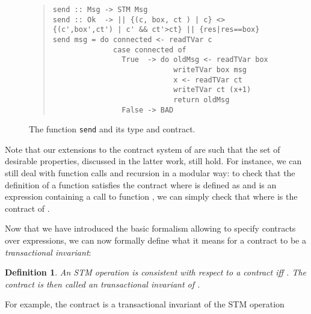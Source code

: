 \documentclass[submission,copyright,creativecommons]{eptcs}
\newtheorem{definition}{Definition}
\begin{document}
\begin{figure}[htb]
  \centering
\begin{footnotesize}
\begin{quote}
\begin{verbatim}
send :: Msg -> STM Msg
send :: Ok  -> || {(c, box, ct ) | c} <> {(c',box',ct') | c' && ct'>ct} || {res|res==box} 
send msg = do connected <- readTVar c
              case connected of 
                True  -> do oldMsg <- readTVar box
                            writeTVar box msg
                            x <- readTVar ct
                            writeTVar ct (x+1)
                            return oldMsg
                False -> BAD
\end{verbatim}
\end{quote}
\end{footnotesize}  
  \caption{The function \texttt{send} and its type and contract.}
  \label{fig:ex:send}
\end{figure}

Note that our extensions to the contract system of \cite{static-contract-checking} are such that the set of desirable properties, discussed in the latter work, still hold. For instance, we can still deal with function calls and recursion in a modular way: to check that the definition of a function  satisfies the contract  where  is defined as  and  is an expression containing a call to function , we can simply check that  where  is the contract of . 


Now that we have introduced the basic formalism allowing to specify contracts over expressions, we can now formally define what it means for a contract to be a \emph{transactional invariant}:
\begin{definition}
  An STM operation  is \emph{consistent} with respect to a contract  iff . The contract  is then called an \emph{transactional invariant} of .
\end{definition}
For example, the contract   is a transactional invariant of the STM operation 
\end{document}
